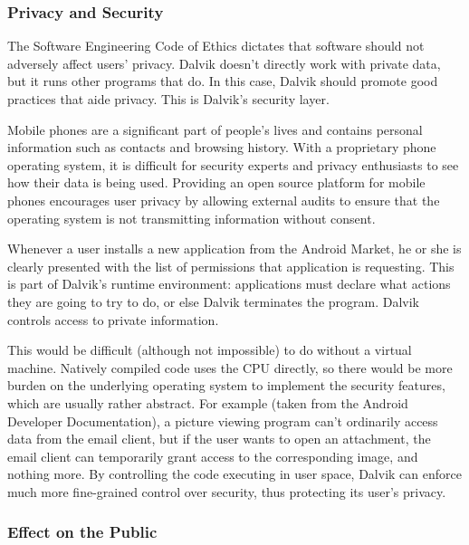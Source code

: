 \documentclass[11pt]{article}
\begin{document}
\begin{multicols}{2}

\subsubsection{Privacy and Security} %
\label{ssub:privacy}

The Software Engineering Code of Ethics dictates that software should not
adversely affect users' privacy.  Dalvik doesn't directly work with private
data, but it runs other programs that do.  In this case, Dalvik should promote
good practices that aide privacy.  This is Dalvik's security layer.

Mobile phones are a significant part of people's lives and contains personal
information such as contacts and browsing history.  With a proprietary phone
operating system, it is difficult for security experts and privacy enthusiasts
to see how their data is being used.  Providing an open source platform for
mobile phones encourages user privacy by allowing external audits to ensure that
the operating system is not transmitting information without consent.

Whenever a user installs a new application from the Android Market, he or she is
clearly presented with the list of permissions that application is requesting.
This is part of Dalvik's runtime environment: applications must declare what
actions they are going to try to do, or else Dalvik terminates the program.
Dalvik controls access to private information.

This would be difficult (although not impossible) to do without a virtual
machine.  Natively compiled code uses the CPU directly, so there would be more
burden on the underlying operating system to implement the security features,
which are usually rather abstract.  For example (taken from the Android
Developer Documentation), a picture viewing program can't ordinarily access data
from the email client, but if the user wants to open an attachment, the email
client can temporarily grant access to the corresponding image, and nothing
more.  By controlling the code executing in user space, Dalvik can enforce much
more fine-grained control over security, thus protecting its user's privacy.


\subsubsection{Effect on the Public} %
\label{ssub:public-effect}


\end{multicols}
\end{document}
